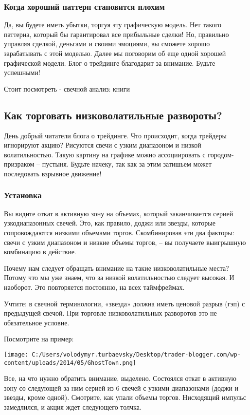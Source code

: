 \documentclass[a5paper]{article}
\begin{document}
\subsubsection{Когда хороший паттерн становится плохим}

Да, вы будете иметь убытки, торгуя эту графическую модель. Нет такого паттерна, который бы гарантировал все прибыльные сделки! Но, правильно управляя сделкой, деньгами и своими эмоциями, вы сможете хорошо зарабатывать с этой моделью. Далее мы поговорим об еще одной хорошей графической модели. Блог о трейдинге благодарит за внимание. Будьте успешными!


Стоит посмотреть - свечной анализ: книги

\subsection{Как торговать низковолатильные развороты?}

День добрый читатели блога о трейдинге. Что происходит, когда трейдеры
игнорируют акцию? Рисуются свечи с узким диапазоном и низкой
волатильностью. Такую картину на графике можно ассоциировать с
городом-призраком – пустыня. Будьте начеку, так как за этим затишьем
может последовать взрывное движение!

\subsubsection{Установка}

Вы видите откат в активную зону на объемах, который заканчивается серией узкодиапазонных свечей. Это, как правило, доджи или звезды, которые сопровождаются низкими объемами торгов. Скомбинировав эти два факторы: свечи с узким диапазоном и низкие объемы торгов, – вы получаете выигрышную комбинацию в действие.

Почему нам следует обращать внимание на такие низковолатильные места? Потому что мы уже знаем, что за низкой волатильностью следует высокая. И наоборот. Это повторяется постоянно, на всех таймфреймах.

Учтите: в свечной терминологии, «звезда» должна иметь ценовой разрыв (гэп) с предыдущей свечой. При торговле низковолатильных разворотов это не обязательное условие.

Посмотрите на пример:

\texttt{[image: C:/Users/volodymyr.turbaevsky/Desktop/trader-blogger.com/wp-content/uploads/2014/05/GhostTown.png]}

Все, на что нужно обратить внимание, выделено. Состоялся откат в активную зону со следующей за ним серией из 6 свечей с узкими диапазонами (доджи и звезды, кроме одной). Смотрите, как упали объемы торгов. Нисходящий импульс замедлился, и акция ждет следующего толчка.
\end{document}
